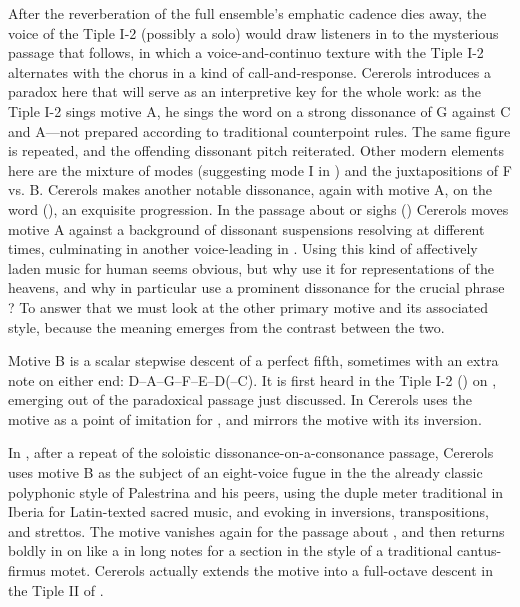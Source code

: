 
After the reverberation of the full ensemble's emphatic cadence dies away, the
voice of the Tiple I-2 (possibly a solo) would draw listeners in to the
mysterious passage that follows, in which a voice-and-continuo texture with the
Tiple I-2 alternates with the chorus in a kind of call-and-response.
Cererols introduces a paradox here that will serve as an interpretive key for
the whole work: as the Tiple I-2 sings motive A, he sings the word
 on a strong dissonance of G against C\sh{} and A---not
prepared according to traditional counterpoint rules.
The same figure is repeated, and the offending dissonant pitch reiterated.
Other modern elements here are the mixture of modes (suggesting mode I in
) and the juxtapositions of F\sh{} vs. B\fl{}.
Cererols makes another notable dissonance, again with motive A, on the word
 (), an exquisite
\musfig{-}{-} progression. %
In the passage about  or sighs () Cererols
moves motive A against a background of dissonant suspensions resolving at
different times, culminating in another voice-leading  in
.
Using this kind of affectively laden music for human  seems
obvious, but why use it for representations of the heavens, and why in
particular use a prominent dissonance for the crucial phrase ?
To answer that we must look at the other primary motive and its associated
style, because the meaning emerges from the contrast between the two.

Motive B is a scalar stepwise descent of a perfect fifth, sometimes with an
extra note on either end: D--A--G--F--E--D(--C\sh). 
It is first heard in the Tiple I-2 () on ,
emerging out of the paradoxical passage just discussed.
In  Cererols uses the motive as a point of imitation for
, and mirrors the motive with its
inversion.

In , after a repeat of the soloistic dissonance-on-a-consonance
passage, Cererols uses motive B as the subject of an eight-voice fugue in the
the already classic polyphonic style of Palestrina and his peers, using the
duple meter traditional in Iberia for Latin-texted sacred music, and evoking
 in inversions, transpositions, and strettos. 
The motive vanishes again for the passage about , and then
returns boldly in  on  like a
  in long notes for a section in the
style of a traditional cantus-firmus motet.
Cererols actually extends the motive into a full-octave descent in the Tiple II
of .


